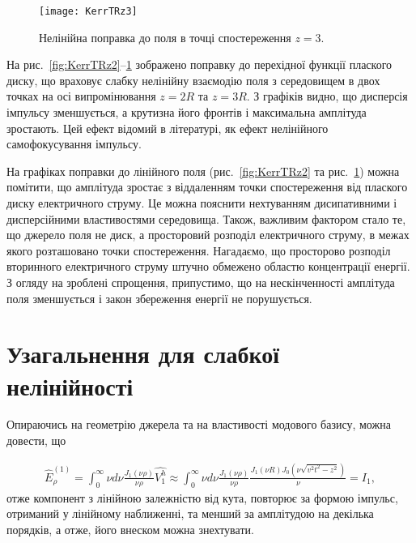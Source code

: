 \begin{figure}[htbp] \begin{center}
\texttt{[image: KerrTRz3]}
\caption{Нелінійна поправка до поля в точці спостереження $ z = 3 $.} 
\label{fig:KerrTRz3}
\end{center} \end{figure}

На рис.~\ref{fig:KerrTRz2}--\ref{fig:KerrTRz3} зображено поправку
до перехідної функції плаского диску, що враховує слабку нелінійну взаємодію 
поля з середовищем в двох точках на осі випромінювання $ z = 2R $ та $ z = 3R $.
З графіків видно, що дисперсія імпульсу зменшується, а крутизна його фронтів і
максимальна амплітуда зростають. Цей ефект відомий в літературі, як ефект 
нелінійного самофокусування імпульсу.

На графіках поправки до лінійного поля (рис.~\ref{fig:KerrTRz2} та 
рис.~\ref{fig:KerrTRz3}) можна помітити, що амплітуда зростає з віддаленням 
точки спостереження від плаского диску електричного струму. Це можна 
пояснити нехтуванням дисипативними і дисперсійними властивостями 
середовища. Також, важливим фактором стало те, що джерело поля не диск, 
а просторовий розподіл електричного струму, в межах якого розташовано точки 
спостереження. Нагадаємо, що просторово розподіл вторинного електричного 
струму штучно обмежено областю концентрації енергії. З огляду на зроблені 
спрощення, припустимо, що на нескінченності амплітуда поля зменшується і закон збереження енергії не порушується.

\section{Узагальнення для слабкої нелінійності}

Опираючись на геометрію джерела та на властивості модового базису, можна 
довести, що 

\begin{equation} \begin{aligned}
\hat{E}_\rho^{(1)} = \int_0^\infty \nu d \nu 
\frac{J_1(\nu \rho)}{\nu \rho} \hat{V_1^h} \approx
\int_0^\infty \nu d \nu \frac{J_1(\nu \rho)}{\nu \rho} 
\frac{J_1(\nu R) J_0(\nu \sqrt{v^2t^2-z^2})}{\nu} = I_1,
\end{aligned} \end{equation}
%
отже компонент з лінійною залежністю від кута, повторює за формою 
імпульс, отриманий у лінійному наближенні, та менший за амплітудою на 
декілька порядків, а отже, його внеском можна знехтувати.

